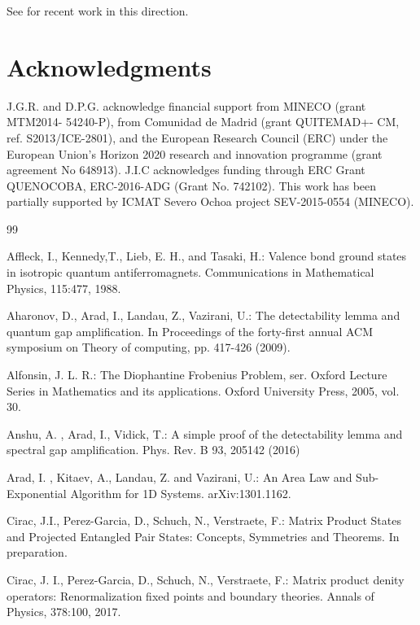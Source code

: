 \documentclass[smallextended]{svjour3}
\renewcommand{\1}{\mathbbm{1}}
\begin{document}
See \cite{Haah} for recent work in this direction.
\section*{Acknowledgments}

J.G.R. and D.P.G. acknowledge financial support from MINECO (grant MTM2014- 54240-P), from Comunidad de Madrid (grant QUITEMAD+- CM, ref. S2013/ICE-2801), and the European Research Council (ERC) under the European Union's Horizon 2020 research and innovation programme (grant agreement No 648913). J.I.C acknowledges funding through ERC Grant QUENOCOBA, ERC-2016-ADG (Grant No. 742102). This work has been partially supported by ICMAT Severo Ochoa project SEV-2015-0554 (MINECO).


\begin{thebibliography}{99}


      Affleck, I., Kennedy,T.,  Lieb, E. H., and  Tasaki, H.: Valence bond ground states in isotropic quantum antiferromagnets. Communications in Mathematical Physics, 115:477, 1988.

      Aharonov, D., Arad, I., Landau,  Z.,  Vazirani, U.: The detectability lemma and quantum gap amplification. In Proceedings of the forty-first annual ACM symposium on Theory of computing, pp. 417-426 (2009).

      Alfonsin, J. L. R.: The Diophantine Frobenius Problem, ser. Oxford Lecture Series in Mathematics and its applications. Oxford University Press, 2005, vol. 30.

     Anshu, A. , Arad,  I.,  Vidick, T.: A simple proof of the detectability lemma and spectral gap amplification. Phys. Rev. B 93, 205142 (2016)

     Arad, I. , Kitaev,  A.,  Landau, Z. and  Vazirani, U.: An Area Law and Sub-Exponential Algorithm for 1D Systems. arXiv:1301.1162.

      Cirac, J.I.,  Perez-Garcia, D.,  Schuch, N., Verstraete,  F.: Matrix Product States and Projected Entangled Pair States: Concepts, Symmetries and Theorems.  In preparation.

      Cirac, J. I.,  Perez-Garcia, D.,  Schuch, N.,  Verstraete,  F.: Matrix product denity operators: Renormalization fixed points and boundary theories. Annals of Physics, 378:100, 2017.


\end{thebibliography}
\end{document}
